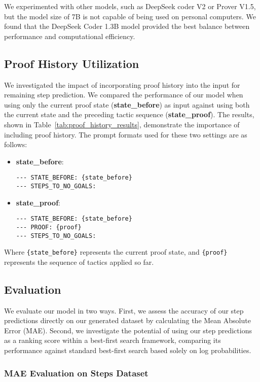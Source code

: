 We experimented with other models, such as DeepSeek coder V2 or Prover V1.5, but the model size of 7B is not capable of being used on personal computers. We found that the DeepSeek Coder 1.3B model provided the best balance between performance and computational efficiency.

\subsection{Proof History Utilization}

We investigated the impact of incorporating proof history into the input for remaining step prediction. We compared the performance of our model when using only the current proof state (\textbf{state\_before}) as input against using both the current state and the preceding tactic sequence (\textbf{state\_proof}). 
The results, shown in Table~\ref{tab:proof_history_results}, demonstrate the importance of including proof history.
The prompt formats used for these two settings are as follows:

\begin{itemize}
    \item \textbf{state\_before}:
    \begin{verbatim}
--- STATE_BEFORE: {state_before}
--- STEPS_TO_NO_GOALS:
    \end{verbatim}
    \item \textbf{state\_proof}:
    \begin{verbatim}
--- STATE_BEFORE: {state_before}
--- PROOF: {proof}
--- STEPS_TO_NO_GOALS:
    \end{verbatim}
\end{itemize}
Where \texttt{\{state\_before\}} represents the current proof state, and \texttt{\{proof\}} represents the sequence of tactics applied so far.

\subsection{Evaluation}

We evaluate our model in two ways. First, we assess the accuracy of our step predictions directly on our generated dataset by calculating the Mean Absolute Error (MAE). Second, we investigate the potential of using our step predictions as a ranking score within a best-first search framework, comparing its performance against standard best-first search based solely on log probabilities.

\subsubsection{MAE Evaluation on Steps Dataset}

